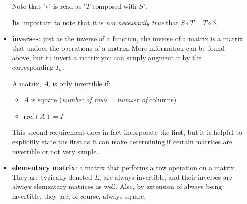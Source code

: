 \documentclass[12pt]{article}
\begin{document}
\begin{itemize}
        Note that "$\circ$" is read as "$T$ composed with $S$".

        Its important to note that it is \textit{not necessarily true} that $S \circ T = T \circ S$.

        \item \textbf{inverses}: just as the inverse of a function, the inverse of a matrix is a matrix that undoes the operations of a matrix. More information can be found above, but to invert a matrix you can simply augment it by the corresponding $I_n$.
        
        A matrix, $A$, is only invertible if:

        \begin{itemize}
            \item $A$ is square (\textit{number of rows = number of} columns)
            \item rref$(A) = I$
        \end{itemize}

        This second requirement does in fact incorporate the first, but it is helpful to explicitly state the first as it can make determining if certain matrices are invertible or not very simple.

        \item \textbf{elementary matrix}: a matrix that performs a row operation on a matrix. They are typically denoted $E$, are always invertible, and their inverses are always elementary matrices as well. Also, by extension of always being invertible, they are, of course, always square.
        
        
    \end{itemize}
\end{document}
